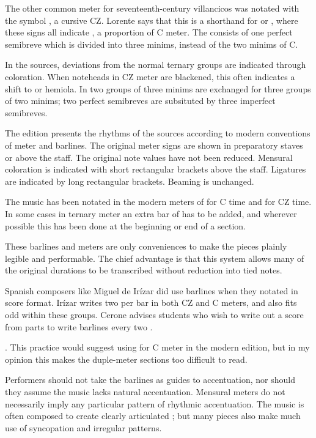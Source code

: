 The other common meter for seventeenth-century villancicos was notated with the symbol \meterCZ{}, a cursive CZ.
Lorente says that this is a shorthand for \meterCThree{} or \meterCThreeTwo{}, where these signs all indicate , a proportion of C meter.%
  \autocite[165]{Lorente:Porque}
The  consists of one perfect semibreve which is divided into three minims, instead of the two minims of C.

In the sources, deviations from the normal ternary groups are indicated through coloration. 
When noteheads in CZ meter are blackened, this often indicates a shift to  or hemiola.
In  two groups of three minims are exchanged for three groups of two minims; two perfect semibreves are subsituted by three imperfect semibreves.

The edition presents the rhythms of the sources according to modern conventions of meter and barlines.
The original meter signs are shown in preparatory staves or above the staff.
The original note values have not been reduced.
Mensural coloration is indicated with short rectangular brackets above the staff.
Ligatures are indicated by long rectangular brackets.
Beaming is unchanged.

The music has been notated in the modern meters of  for C time and  for CZ time.
In some cases in ternary meter an extra bar of  has to be added, and wherever possible this has been done at the beginning or end of a section.

These barlines and meters are only conveniences to make the pieces plainly legible and performable.
The chief advantage is that this system allows many of the original durations to be transcribed without reduction into tied notes.

Spanish composers like Miguel de Irízar did use barlines when they notated in score format.
Irízar writes two  per bar in both CZ and C meters, and also fits odd  within these groups.
Cerone advises students who wish to write out a score from parts to write barlines every two .%
  \begin{Footnote}
  \autocite[745]{Cerone:Melopeo}.
  This practice would suggest using  for C meter in the modern edition, but in my opinion this makes the duple-meter sections too difficult to read.
  \end{Footnote}

Performers should not take the barlines as guides to accentuation, nor should they assume the music lacks natural accentuation.
Mensural meters do not necessarily imply any particular pattern of rhythmic accentuation.
The music is often composed to create clearly articulated ; but many pieces also make much use of syncopation and irregular patterns.

